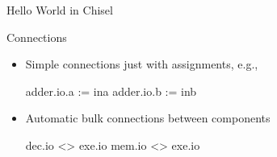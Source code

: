 \begin{frame}[fragile]{Hello World in Chisel}
\end{frame}

\begin{frame}[fragile]{Connections}
\begin{itemize}
\item Simple connections just with assignments, e.g.,
\begin{chisel}
  adder.io.a := ina
  adder.io.b := inb
\end{chisel}
\item Automatic bulk connections between components
\begin{chisel}
  dec.io <> exe.io
  mem.io <> exe.io
\end{chisel}
\end{itemize}
\end{frame}








